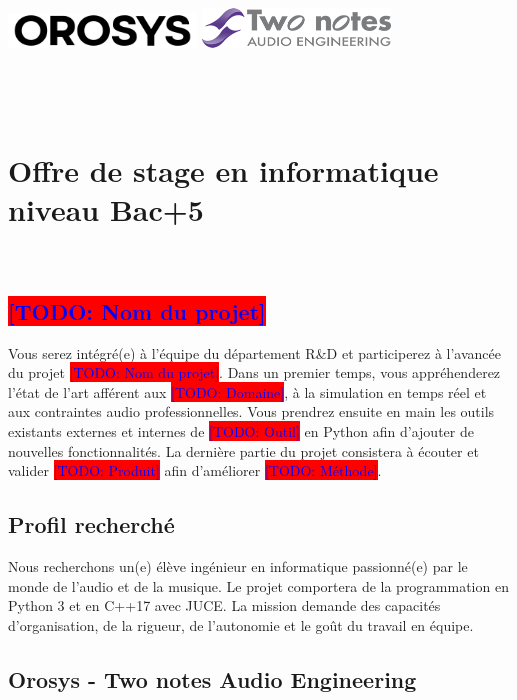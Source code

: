 \documentclass[12pt, a4paper]{article}
\newcommand\todo[1]{\colorbox{red}{\textcolor{blue}{[TODO: #1]}}} %
\begin{document}
\thispagestyle{empty}               %
\begin{center}
    \includegraphics[width=5cm]{../img/logo_orosys.png} \hspace{1cm} \includegraphics[width=5cm]{../img/logo_twonotes.png} ~\\~\\~\\~\\
    \section*{Offre de stage en informatique niveau Bac+5}
\end{center}

~\\

\subsection*{\todo{Nom du projet}}

Vous serez intégré(e) à l'équipe du département R\&D et participerez à l'avancée du projet \todo{Nom du projet}.
Dans un premier temps, vous appréhenderez l'état de l'art afférent aux \todo{Domaine}, à la simulation en temps réel et aux contraintes audio professionnelles.
Vous prendrez ensuite en main les outils existants externes et internes de \todo{Outil} en Python afin d'ajouter de nouvelles fonctionnalités.
La dernière partie du projet consistera à écouter et valider \todo{Produit} afin d'améliorer \todo{Méthode}.

\subsection*{Profil recherché}

Nous recherchons un(e) élève ingénieur en informatique passionné(e) par le monde de l'audio et de la musique.
Le projet comportera de la programmation en Python 3 et en C++17 avec JUCE.
La mission demande des capacités d'organisation, de la rigueur, de l'autonomie et le goût du travail en équipe.

\subsection*{Orosys - Two notes Audio Engineering}
\end{document}
